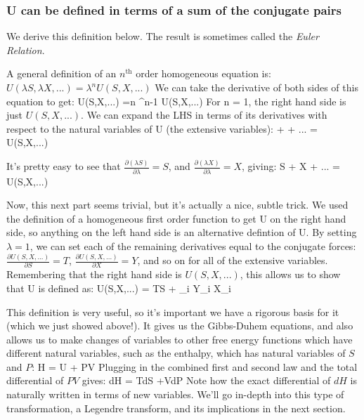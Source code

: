 \documentclass[12pt]{article}
\begin{document}
\subsubsection{U can be defined in terms of a sum of the conjugate pairs}
We derive this definition below. The result is sometimes called the \emph{Euler Relation}.

A general definition of an $n^\text{th}$ order homogeneous equation is:
$U(\lambda S, \lambda X,...)=\lambda^n U(S,X,...)$
We can take the derivative of both sides of this equation to get:
\eqs
\frac{\partial}{\partial \lambda} U(\lambda S,\lambda X,...) =n \lambda^{n-1} U(S,X,...)
\eqe
For n = 1, the right hand side is just $U(S,X,...)$. We can expand the LHS in terms of its derivatives with respect to the natural variables of U (the extensive variables):
\eqs
{}  +   + ... = U(S,X,...)
\eqe

It's pretty easy to see that $\frac{\partial (\lambda S)}{\partial \lambda} = S$, and $\frac{\partial (\lambda X)}{\partial \lambda} = X$, giving:
\eqs
S  + X  + ... = U(S,X,...)
\eqe

Now, this next part seems trivial, but it's actually a nice, subtle trick. We used the definition of a homogeneous first order function to get U on the right hand side, so anything on the left hand side is an alternative defintion of U. By setting $\lambda = 1$, we can set each of the remaining derivatives equal to the conjugate forces:
$\frac{\partial U(S, X,...)}{\partial S} = T$, $\frac{\partial U(S, X,...)}{\partial X} = Y$, and so on for all of the extensive variables.
Remembering that the right hand side is $U(S,X,...)$, this allows us to show that U is defined as:
\eqs
U(S,X,...) = TS + \sum_i Y_i X_i
\eqe

This definition is very useful, so it's important we have a rigorous basis for it (which we just showed above!). It gives us the Gibbs-Duhem equations, and also allows us to make changes of variables to other free energy functions which have different natural variables, such as the enthalpy, which has natural variables of $S$ and $P$:
\eqs H = U + PV \eqe
Plugging in the combined first and second law and the total differential of $PV$ gives:
\eqs dH = TdS +VdP \eqe
Note how the exact differential of $dH$ is naturally written in terms of new variables. We'll go in-depth into this type of transformation, a Legendre transform, and its implications in the next section.
\end{document}
